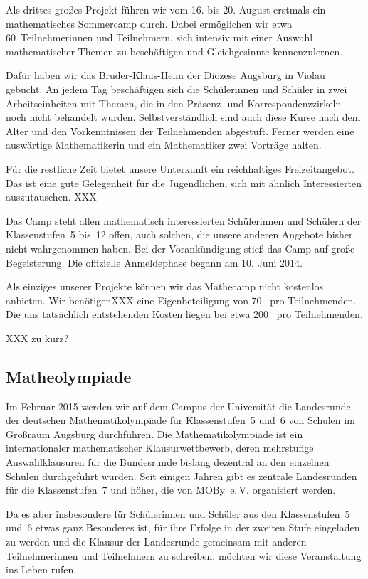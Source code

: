 \documentclass[12pt]{zettel}
\begin{document}
Als drittes großes Projekt führen wir vom 16. bis 20. August erstmals ein
mathematisches Sommercamp durch. Dabei ermöglichen wir etwa 60~Teilnehmerinnen
und Teilnehmern, sich intensiv mit einer Auswahl mathematischer Themen zu
beschäftigen und Gleichgesinnte kennenzulernen.

Dafür haben wir das Bruder-Klaus-Heim der Diözese Augsburg in Violau
gebucht. An jedem Tag beschäftigen sich die Schülerinnen und Schüler in zwei
Arbeitseinheiten mit Themen, die in den Präsenz- und Korrespondenzzirkeln noch
nicht behandelt wurden. Selbstverständlich sind auch diese Kurse nach dem Alter
und den Vorkenntnissen der Teilnehmenden abgestuft. Ferner
werden eine auswärtige Mathematikerin und ein Mathematiker zwei Vorträge halten.

Für die restliche Zeit bietet unsere Unterkunft ein reichhaltiges
Freizeitangebot. Das ist eine gute Gelegenheit für die Jugendlichen,
sich mit ähnlich Interessierten auszutauschen. XXX

Das Camp steht allen mathematisch interessierten Schülerinnen und Schülern der
Klassenstufen~5 bis~12 offen, auch solchen, die unsere anderen Angebote bisher
nicht wahrgenommen haben. Bei der Vorankündigung stieß das Camp auf große
Begeisterung. Die offizielle Anmeldephase begann am 10. Juni 2014.

Als einziges unserer Projekte können wir das Mathecamp nicht kostenlos
anbieten. Wir benötigenXXX eine Eigenbeteiligung von 70~\texteuro{} pro
Teilnehmenden. Die uns tatsächlich entstehenden Kosten liegen bei etwa
200~\texteuro{} pro Teilnehmenden.

XXX zu kurz?


\subsection{Matheolympiade}

Im Februar 2015 werden wir auf dem Campus der Universität die Landesrunde der deutschen
Mathematikolympiade für Klassenstufen~5 und~6 von Schulen im Großraum
Augsburg durchführen. Die Mathematikolympiade ist ein internationaler mathematischer
Klausurwettbewerb, deren mehrstufige Auswahlklausuren für die Bundesrunde
bislang dezentral an den einzelnen Schulen durchgeführt wurden. Seit einigen
Jahren gibt es zentrale Landesrunden für die Klassenstufen~7 und höher, die von
MOBy~e.\,V. organisiert werden.

Da es aber insbesondere für Schülerinnen und Schüler aus den Klassenstufen~5
und~6 etwas ganz Besonderes ist, für ihre Erfolge in der zweiten Stufe
eingeladen zu werden und die Klausur der Landesrunde gemeinsam mit anderen
Teilnehmerinnen und Teilnehmern zu schreiben, möchten wir diese Veranstaltung
ins Leben rufen.
\end{document}
